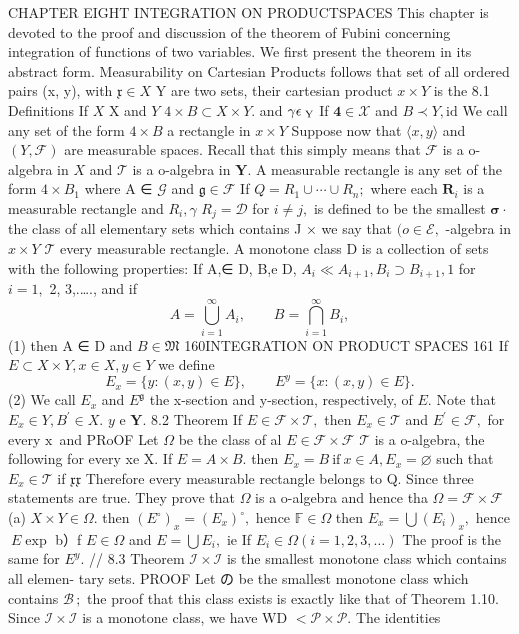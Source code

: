 CHAPTER EIGHT INTEGRATION ON PRODUCTSPACES This chapter is devoted to the proof and discussion of the theorem of Fubini concerning integration of functions of two variables. We first present the theorem in its abstract form. Measurability on Cartesian Products follows that set of all ordered pairs (x, y), with ${\mathfrak{x}}\in X$ Y are two sets, their cartesian product $x\times Y$ is the 8.1 Definitions If $\textstyle X$ X and ${\mathbf{}}Y$ $4\times B\subset X\times Y.$ and $\gamma\epsilon_{\mathrm{\tiny~Y}}$ If ${\boldsymbol{4}}\in{\mathcal{X}}$ and $B\prec Y,{\mathrm{id}}$ We call any set of the form $\scriptstyle4\times B$ a rectangle in $x\times Y$ Suppose now that $\langle x,y\rangle$ and $(Y,{\mathcal{F}})$ are measurable spaces. Recall that this simply means that ${\mathcal{F}}$ is a o-algebra in $X$ and ${\mathcal{T}}$ is a o-algebra in ${\boldsymbol{Y}}.$ A measurable rectangle is any set of the form $4\times B_{1}$ where A ∈ ${\mathcal{G}}$ and ${\mathfrak{g}}\in{\mathcal{F}}$ If $Q=R_{1}\cup\dotsb\cup R_{n};$ where each ${\boldsymbol{R}}_{i}$ is a measurable rectangle and $R_{i},\gamma$ $R_{j}=\mathcal{D}$ for $i\neq j,$ is defined to be the smallest ${\boldsymbol{\sigma}}\cdot$ the class of all elementary sets which contains J × we say that $(o\in{\mathcal{E}},$ -algebra in $x\times Y$ ${\mathcal{T}}$ every measurable rectangle. A monotone class D is a collection of sets with the following properties: If A,∈ D, B,e D, $A_{i}\ll A_{i+1},B_{i}\supset B_{i+1},1$ for $i=1,$ 2, 3,.…., and if $$ A=\bigcup_{i=1}^{\infty}A_{i},\qquad B=\bigcap_{i=1}^{\infty}B_{i}, $$ (1) then A ∈ D and $B\in{\mathfrak{M}}$ 160INTEGRATION ON PRODUCT SPACES 161 If $E\subset X\times Y,x\in X,y\in Y$ we define $$ E_{x}=\{y\colon(x,y)\in E\},\qquad E^{y}=\{x\colon(x,y)\in E\}. $$ (2) We call $E_{x}$ and $E^{\mathfrak{g}}$ the x-section and y-section, respectively, of $\textstyle E.$ Note that $E_{x}\in Y,B^{\prime}\in X.$ $\scriptstyle{y}$ e ${\boldsymbol{Y}}.$ 8.2 Theorem If $E\in{\mathcal{F}}\times{\mathcal{T}},$ then $E_{x}\in{\mathcal{T}}$ and $E^{\prime}\in{\mathcal{F}},$ for every $\mathrm{x\!\,}$ and PRoOF Let $\Omega$ be the class of al $E\in{\mathcal{F}}\times{\mathcal{F}}$ $\textstyle{\mathcal{T}}$ is a o-algebra, the following for every xe X. If $E=A\times B.$ then $E_{x}=B\ {\mathrm{if~}}x\in A,E_{x}=\varnothing$ such that $E_{x}\in{\mathcal{T}}$ if ${\mathfrak{x}}{\mathfrak{x}}$ Therefore every measurable rectangle belongs to Q. Since three statements are true. They prove that $\Omega$ is a o-algebra and hence tha $\Omega={\mathcal{F}}\times{\mathcal{F}}$ (a) $X\times Y\in\Omega.$ then $(E^{\circ})_{x}=(E_{x})^{\circ},$ hence $\mathbb{F}\in\Omega$ then $E_{x}=\bigcup(E_{i})_{x},$ hence $\ E\exp$ b）f $\textstyle E\in\Omega$ and $E=\bigcup E_{i},$ ie If $E_{i}\in\Omega\left(i=1,2,3,\ldots\right)$ The proof is the same for $E^{y}.$ // 8.3 Theorem ${\mathcal{I}}\times{\mathcal{I}}$ is the smallest monotone class which contains all elemen- tary sets. PROOF Let の be the smallest monotone class which contains ${\mathcal{B}}\,;$ the proof that this class exists is exactly like that of Theorem 1.10. Since ${\mathcal{I}}\times{\mathcal{I}}$ is a monotone class, we have WD $<{\mathcal{P}}\times{\mathcal{P}}.$ The identities 